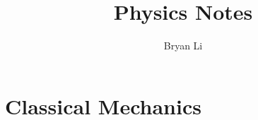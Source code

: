 \documentclass{../mimosis}
\title{Physics Notes}
\author{Bryan Li}
\begin{document}
    \maketitle
    \tableofcontents

    \part{Classical Mechanics}
    
        
    
    
    
    \printindex
\end{document}
